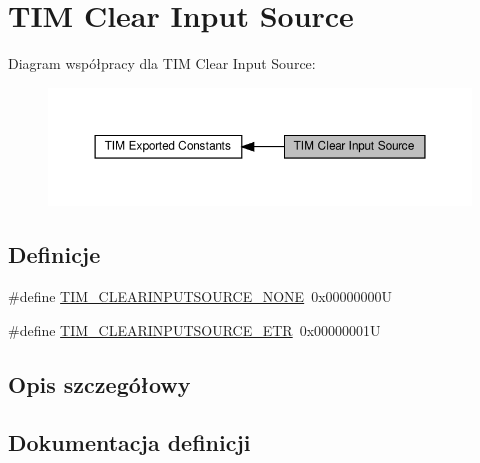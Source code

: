 \hypertarget{group___t_i_m___clear_input___source}{}\section{T\+IM Clear Input Source}
\label{group___t_i_m___clear_input___source}
Diagram współpracy dla T\+IM Clear Input Source\+:\nopagebreak
\begin{figure}[H]
\begin{center}
\leavevmode
\includegraphics[width=350pt]{group___t_i_m___clear_input___source}
\end{center}
\end{figure}
\subsection*{Definicje}
\begin{DoxyCompactItemize}
\item 
\#define \hyperlink{group___t_i_m___clear_input___source_ga48c5312aecd377fab00d62e9b4169e9e}{T\+I\+M\+\_\+\+C\+L\+E\+A\+R\+I\+N\+P\+U\+T\+S\+O\+U\+R\+C\+E\+\_\+\+N\+O\+NE}~0x00000000U
\item 
\#define \hyperlink{group___t_i_m___clear_input___source_gaa28a8cf1db85cf6c845c6c1f02ba5c8e}{T\+I\+M\+\_\+\+C\+L\+E\+A\+R\+I\+N\+P\+U\+T\+S\+O\+U\+R\+C\+E\+\_\+\+E\+TR}~0x00000001U
\end{DoxyCompactItemize}


\subsection{Opis szczegółowy}


\subsection{Dokumentacja definicji}
\mbox{\label{group___t_i_m___clear_input___source_gaa28a8cf1db85cf6c845c6c1f02ba5c8e}} 
